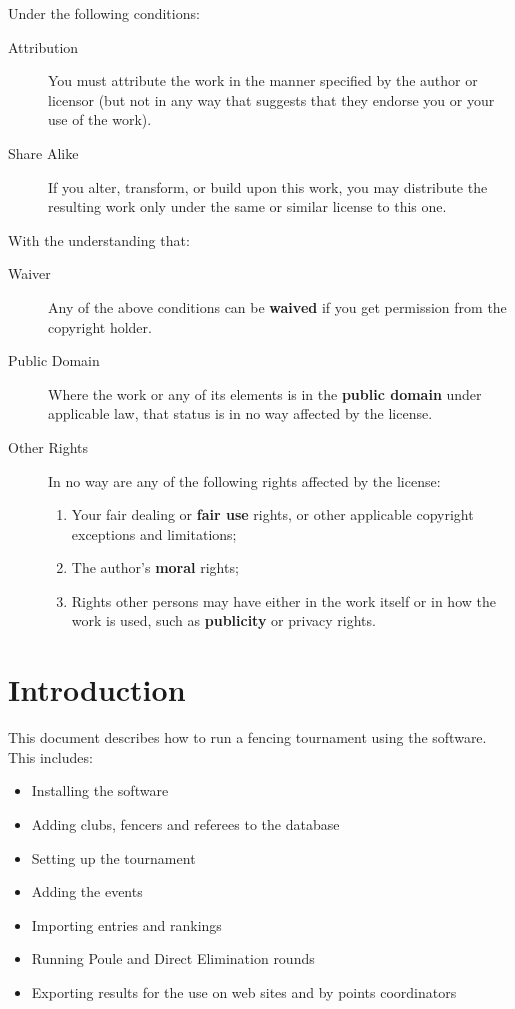 \documentclass[a4paper,11pt]{memoir}
\begin{document}
Under the following conditions:

\begin{description}
 \item[Attribution] You must attribute the work in the manner specified by the author or licensor (but not in any way that suggests that they endorse you or your use of the work).
 \item[Share Alike] If you alter, transform, or build upon this work, you may distribute the resulting work only under the same or similar license to this one.
\end{description}

With the understanding that:

 \begin{description}
  \item[Waiver] Any of the above conditions can be \textbf{waived} if you get permission from the copyright holder.
  \item[Public Domain] Where the work or any of its elements is in the \textbf{public domain} under applicable law, that status is in no way affected by the license. 
  \item[Other Rights] In no way are any of the following rights affected by the license:
  \begin{enumerate}
   \item Your fair dealing or \textbf{fair use} rights, or other applicable copyright exceptions and limitations;
   \item The author's \textbf{moral} rights;
   \item Rights other persons may have either in the work itself or in how the work is used, such as \textbf{publicity} or privacy rights.
  \end{enumerate}
 \end{description}

\tableofcontents

\listoffigures

\listoftables

\graphicspath{{./screenCaptures/}}

\mainmatter

\chapter{Introduction}

This document describes how to run a fencing tournament using the \fencingtime{} software. This includes:
\begin{itemize}
 \item Installing the software
 \item Adding clubs, fencers and referees to the database
 \item Setting up the tournament
 \item Adding the events
 \item Importing entries and rankings
 \item Running Poule and Direct Elimination rounds
 \item Exporting results for the use on web sites and by points coordinators
\end{itemize}
\end{document}
